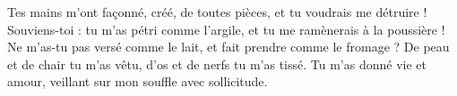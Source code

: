 Tes mains m’ont façonné, créé, de toutes pièces, et tu voudrais me détruire !
Souviens-toi : tu m’as pétri comme l’argile, et tu me ramènerais à la poussière !
Ne m’as-tu pas versé comme le lait, et fait prendre comme le fromage ?
De peau et de chair tu m’as vêtu, d’os et de nerfs tu m’as tissé.
Tu m’as donné vie et amour, veillant sur mon souffle avec sollicitude.